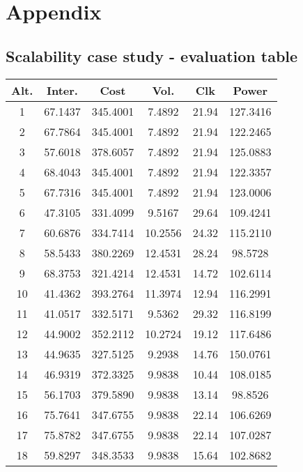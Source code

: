 \appendix
\chapter{Appendix}

\renewcommand\thesection{\Roman{section}}
\fancyhead[LO]{\bfseries\rightmark}     %

\section{Scalability case study - evaluation table}
\label{apdx:prom804}
\begin{center}
\begin{footnotesize}
\begin{tabular}{|c|ccccc|}
\hline
Alt. & Inter. & Cost & Vol. & Clk & Power\\
\hline
1 & 67.1437 & 345.4001 & 7.4892 & 21.94 & 127.3416 \\
2 & 67.7864 & 345.4001 & 7.4892 & 21.94 & 122.2465 \\
3 & 57.6018 & 378.6057 & 7.4892 & 21.94 & 125.0883 \\
4 & 68.4043 & 345.4001 & 7.4892 & 21.94 & 122.3357 \\
5 & 67.7316 & 345.4001 & 7.4892 & 21.94 & 123.0006 \\
6 & 47.3105 & 331.4099 & 9.5167 & 29.64 & 109.4241 \\
7 & 60.6876 & 334.7414 & 10.2556 & 24.32 & 115.2110 \\
8 & 58.5433 & 380.2269 & 12.4531 & 28.24 & 98.5728 \\
9 & 68.3753 & 321.4214 & 12.4531 & 14.72 & 102.6114 \\
10 & 41.4362 & 393.2764 & 11.3974 & 12.94 & 116.2991 \\
11 & 41.0517 & 332.5171 & 9.5362 & 29.32 & 116.8199 \\
12 & 44.9002 & 352.2112 & 10.2724 & 19.12 & 117.6486 \\
13 & 44.9635 & 327.5125 & 9.2938 & 14.76 & 150.0761 \\
14 & 46.9319 & 372.3325 & 9.9838 & 10.44 & 108.0185 \\
15 & 56.1703 & 379.5890 & 9.9838 & 13.14 & 98.8526 \\
16 & 75.7641 & 347.6755 & 9.9838 & 22.14 & 106.6269 \\
17 & 75.8782 & 347.6755 & 9.9838 & 22.14 & 107.0287 \\
18 & 59.8297 & 348.3533 & 9.9838 & 15.64 & 102.8682 \\

\end{tabular}
\end{footnotesize}
\end{center}
